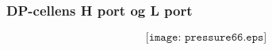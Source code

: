 \documentclass[aspectratio=169,xcolor=dvipsnames]{beamer}
\begin{document}
%
%
%
%
%
%
\begin{frame}
	\frametitle{DP-cellens H port og L port}

	$$\texttt{[image: pressure66.eps]}$$
\end{frame}
\end{document}
